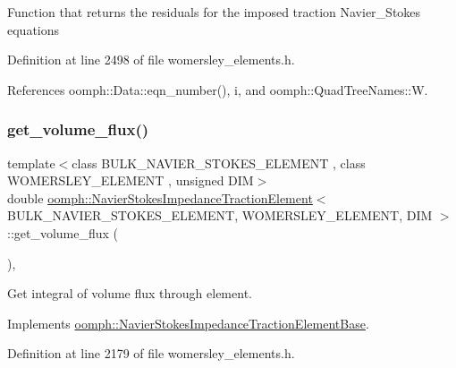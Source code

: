 Function that returns the residuals for the imposed traction Navier\+\_\+\+Stokes equations 

Definition at line 2498 of file womersley\+\_\+elements.\+h.



References oomph\+::\+Data\+::eqn\+\_\+number(), i, and oomph\+::\+Quad\+Tree\+Names\+::W.

\mbox{\label{classoomph_1_1NavierStokesImpedanceTractionElement_a853055ebb50a6500602288a6f0563852}} 
\subsubsection{\texorpdfstring{get\+\_\+volume\+\_\+flux()}{get\_volume\_flux()}}
{\footnotesize\ttfamily template$<$class B\+U\+L\+K\+\_\+\+N\+A\+V\+I\+E\+R\+\_\+\+S\+T\+O\+K\+E\+S\+\_\+\+E\+L\+E\+M\+E\+NT , class W\+O\+M\+E\+R\+S\+L\+E\+Y\+\_\+\+E\+L\+E\+M\+E\+NT , unsigned D\+IM$>$ \\
double \hyperlink{classoomph_1_1NavierStokesImpedanceTractionElement}{oomph\+::\+Navier\+Stokes\+Impedance\+Traction\+Element}$<$ B\+U\+L\+K\+\_\+\+N\+A\+V\+I\+E\+R\+\_\+\+S\+T\+O\+K\+E\+S\+\_\+\+E\+L\+E\+M\+E\+NT, W\+O\+M\+E\+R\+S\+L\+E\+Y\+\_\+\+E\+L\+E\+M\+E\+NT, D\+IM $>$\+::get\+\_\+volume\+\_\+flux (\begin{DoxyParamCaption}{ }\end{DoxyParamCaption})\hspace{0.3cm}{\ttfamily [inline]}, {\ttfamily [virtual]}}



Get integral of volume flux through element. 



Implements \hyperlink{classoomph_1_1NavierStokesImpedanceTractionElementBase_a7f71882ae8a0d34e3d5a5c91586081b3}{oomph\+::\+Navier\+Stokes\+Impedance\+Traction\+Element\+Base}.



Definition at line 2179 of file womersley\+\_\+elements.\+h.



